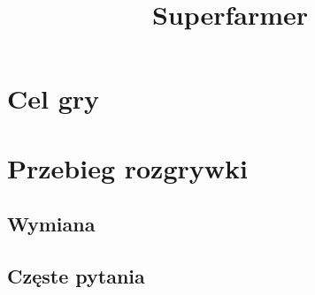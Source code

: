 \documentclass{article}
\title{Superfarmer}
\begin{document}
\maketitle

\section{Cel gry}

\section{Przebieg rozgrywki}

\subsection{Wymiana}

\subsection{Częste pytania}
\end{document}
